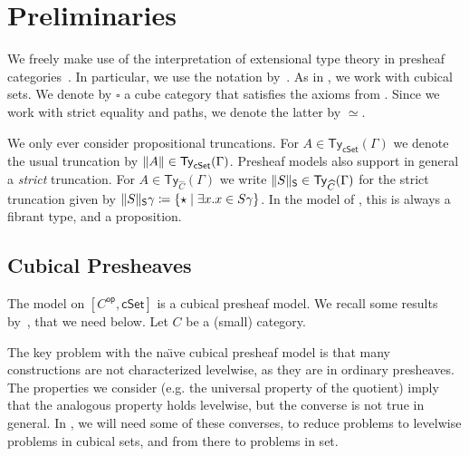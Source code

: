 \documentclass[10pt,a4paper]{article}
\newcommand{\cSet}{\mathsf{cSet}}
\DeclareMathOperator\op{\mathsf{op}}
\newcommand\Ty{\mathsf{Ty}}
\DeclarePairedDelimiter\set{\{}{\}}
\begin{document}
\section{Preliminaries}\label{sec:preliminaries}

We freely make use of the interpretation of extensional type theory in presheaf categories~\cite{hofmann,huber-phd-thesis}.
In particular, we use the notation by~\cite{huber-phd-thesis}.
As in \cite{draft}, we work with cubical sets.
We denote by \(\square\) a cube category that satisfies the axioms from \cite{survey}.
Since we work with strict equality and paths, we denote the latter by \(\simeq\).


We only ever consider propositional truncations.
For \(A \in \Ty_{\cSet}(\Gamma)\) we denote the usual truncation by \(\trunc{A} \in \Ty_{\cSet}(\Gamma)\).
Presheaf models also support in general a \emph{strict} truncation.
For \(A \in \Ty_{\widehat{C}}(\Gamma)\) we write \(\trunc*{S} \in \Ty_{\widehat{C}}(\Gamma)\) for the strict truncation given by \(\trunc*{S}\gamma \coloneqq \set{ \star \mid \exists x. x \in S\gamma }\).
In the model of \HoTT{}, this is always a fibrant type, and a proposition.


\subsection{Cubical Presheaves}

The model on \([C^{\op}, \cSet]\) is a cubical presheaf model.
We recall some results by~\cite{CRS21}, that we need below.
Let \(C\) be a (small) category.

The key problem with the na{\"\i}ve cubical presheaf model is that many constructions are not characterized levelwise, as they are in ordinary presheaves.
The properties we consider (e.g. the universal property of the quotient) imply that the analogous property holds levelwise, but the converse is not true in general.
In , we will need some of these converses, to reduce problems to levelwise problems in cubical sets, and from there to problems in set.
\end{document}
